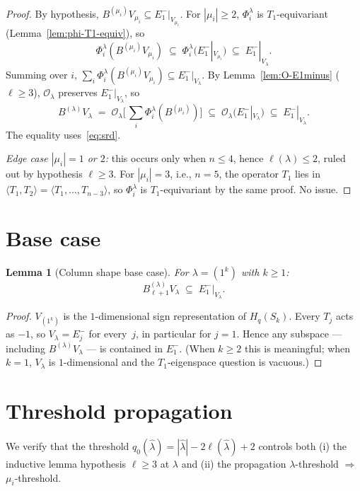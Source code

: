 \documentclass[11pt]{article}
\newtheorem{lemma}[theorem]{Lemma}
\theoremstyle{definition}
\begin{document}
\begin{proof}
By hypothesis, $B^{(\mu_i)} V_{\mu_i} \subseteq E_1^-|_{V_{\mu_i}}$.
For $|\mu_i| \ge 2$, $\Phi_i^\lambda$ is $T_1$-equivariant
(Lemma~\ref{lem:phi-T1-equiv}), so
\[
   \Phi_i^\lambda(B^{(\mu_i)} V_{\mu_i})
   \;\subseteq\; \Phi_i^\lambda(E_1^-|_{V_{\mu_i}})
   \;\subseteq\; E_1^-|_{V_\lambda}.
\]
Summing over $i$,
$\sum_i \Phi_i^\lambda(B^{(\mu_i)} V_{\mu_i}) \subseteq E_1^-|_{V_\lambda}$.
By Lemma~\ref{lem:O-E1minus} ($\ell \ge 3$),
$\mathcal{O}_\lambda$ preserves $E_1^-|_{V_\lambda}$, so
\[
   B^{(\lambda)} V_\lambda
   \;=\; \mathcal{O}_\lambda \Big[\, \sum_i \Phi_i^\lambda(B^{(\mu_i)})\Big]
   \;\subseteq\; \mathcal{O}_\lambda\big(E_1^-|_{V_\lambda}\big)
   \;\subseteq\; E_1^-|_{V_\lambda}.
\]
The equality uses~\eqref{eq:srd}.

\emph{Edge case $|\mu_i| = 1$ or $2$:} this occurs only when $n \le 4$,
hence $\ell(\lambda) \le 2$, ruled out by hypothesis $\ell \ge 3$.
For $|\mu_i| = 3$, i.e., $n = 5$, the operator $T_1$ lies in
$\langle T_1, T_2 \rangle = \langle T_1, \ldots, T_{n-3}\rangle$, so
$\Phi_i^\lambda$ is $T_1$-equivariant by the same proof. No issue.
\end{proof}

\section{Base case}\label{sec:base}

\begin{lemma}[Column shape base case]\label{lem:base}
For $\lambda = (1^k)$ with $k \ge 1$:
\[
   B^{(\lambda)}_{\ell+1} V_\lambda
   \;\subseteq\; E_1^-|_{V_\lambda}.
\]
\end{lemma}

\begin{proof}
$V_{(1^k)}$ is the $1$-dimensional sign representation of $H_q(S_k)$.
Every $T_j$ acts as $-1$, so $V_\lambda = E_j^-$ for every~$j$, in
particular for $j = 1$. Hence any subspace --- including
$B^{(\lambda)} V_\lambda$ --- is contained in $E_1^-$. (When $k \ge 2$
this is meaningful; when $k = 1$, $V_\lambda$ is $1$-dimensional and
the $T_1$-eigenspace question is vacuous.)
\end{proof}

\section{Threshold propagation}\label{sec:threshold}

We verify that the threshold $q_0(\hat\lambda) = |\hat\lambda| - 2\ell(\hat\lambda) + 2$
controls both (i) the inductive lemma hypothesis $\ell \ge 3$ at
$\lambda$ and (ii) the propagation $\lambda$-threshold $\Rightarrow$
$\mu_i$-threshold.
\end{document}
